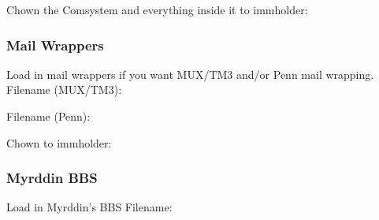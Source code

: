 \documentclass[letterpaper,10pt,english]{sphinxmanual}
\begin{document}
\sphinxAtStartPar
Chown the Comsystem and everything inside it to immholder:

\begin{sphinxVerbatim}[commandchars=\\\{\}]
 
  
 
\end{sphinxVerbatim}


\subsubsection{Mail Wrappers}
\label{\detokenize{gettingstarted:mail-wrappers}}
\sphinxAtStartPar
Load in mail wrappers if you want MUX/TM3 and/or Penn mail wrapping.
Filename (MUX/TM3):

\begin{sphinxVerbatim}[commandchars=\\\{\}]
\end{sphinxVerbatim}

\sphinxAtStartPar
Filename (Penn):

\begin{sphinxVerbatim}[commandchars=\\\{\}]
\end{sphinxVerbatim}

\sphinxAtStartPar
Chown to immholder:

\begin{sphinxVerbatim}[commandchars=\\\{\}]
 
 
  
\end{sphinxVerbatim}


\subsubsection{Myrddin BBS}
\label{\detokenize{gettingstarted:myrddin-bbs}}
\sphinxAtStartPar
Load in Myrddin’s BBS
Filename:
\end{document}
